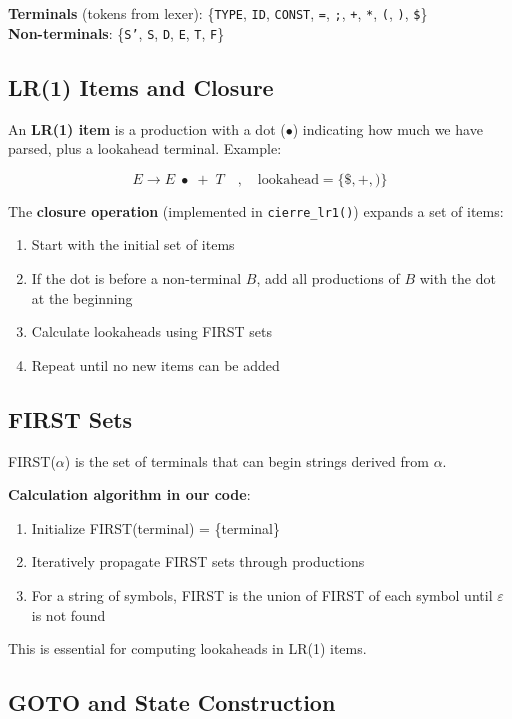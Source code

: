 \documentclass[letterpaper,12pt,oneside]{article}
\begin{document}
	\noindent\textbf{Terminals} (tokens from lexer): \{\texttt{TYPE}, \texttt{ID}, \texttt{CONST}, \texttt{=}, \texttt{;}, \texttt{+}, \texttt{*}, \texttt{(}, \texttt{)}, \texttt{\$}\}\\
	\textbf{Non-terminals}: \{\texttt{S'}, \texttt{S}, \texttt{D}, \texttt{E}, \texttt{T}, \texttt{F}\}
	
	\subsection{LR(1) Items and Closure}
	
	An \textbf{LR(1) item} is a production with a dot ($\bullet$) indicating how much we have parsed, plus a lookahead terminal. Example:
	
	\[
	E \rightarrow E \; \bullet \; + \; T \quad , \quad \text{lookahead} = \{ \$, +, ) \}
	\]
	
	The \textbf{closure operation} (implemented in \texttt{cierre\_lr1()}) expands a set of items:
	\begin{enumerate}
		\item Start with the initial set of items
		\item If the dot is before a non-terminal $B$, add all productions of $B$ with the dot at the beginning
		\item Calculate lookaheads using FIRST sets
		\item Repeat until no new items can be added
	\end{enumerate}
	
	\subsection{FIRST Sets}
	
	FIRST($\alpha$) is the set of terminals that can begin strings derived from $\alpha$.
	
	\textbf{Calculation algorithm in our code}:
	\begin{enumerate}
		\item Initialize FIRST(terminal) = \{terminal\}
		\item Iteratively propagate FIRST sets through productions
		\item For a string of symbols, FIRST is the union of FIRST of each symbol until $\varepsilon$ is not found
	\end{enumerate}
	
	This is essential for computing lookaheads in LR(1) items.
	
	\subsection{GOTO and State Construction}
	
\end{document}
